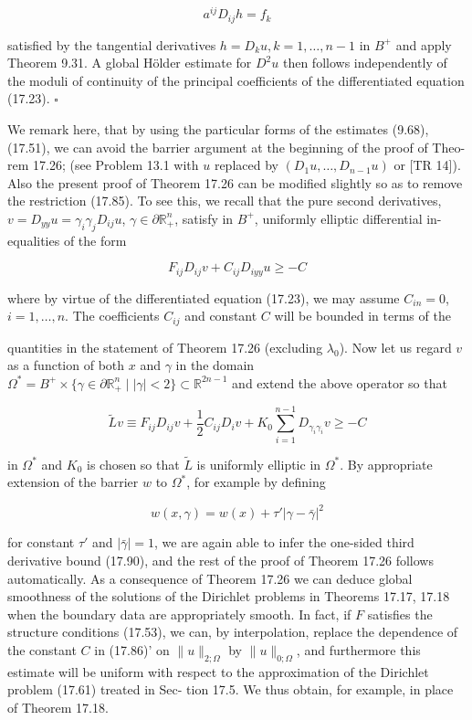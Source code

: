 \[
a^{ij} D_{ij} h = f_k
\]

satisfied by the tangential derivatives \(h = D_k u, k = 1,\ldots,n-1\) in \(B^+\) and apply
Theorem 9.31. A global Hölder estimate for \(D^2 u\) then follows independently of the
moduli of continuity of the principal coefficients of the differentiated equation
(17.23). \(\square\)

We remark here, that by using the particular forms of the estimates (9.68),
(17.51), we can avoid the barrier argument at the beginning of the proof of Theo-
rem 17.26; (see Problem 13.1 with \(u\) replaced by \((D_1 u, \ldots, D_{n-1} u)\) or [TR 14]).
Also the present proof of Theorem 17.26 can be modified slightly so as to remove
the restriction (17.85). To see this, we recall that the pure second derivatives,
\(v = D_{yy} u = \gamma_i \gamma_j D_{ij} u\), \(\gamma \in \partial \mathbb{R}_+^n\), satisfy in \(B^+\), uniformly elliptic differential in-
equalities of the form

\[
F_{ij} D_{ij} v + C_{ij} D_{iyy} u \ge -C
\]

where by virtue of the differentiated equation (17.23), we may assume \(C_{in} = 0\),
\(i = 1,\ldots,n\). The coefficients \(C_{ij}\) and constant \(C\) will be bounded in terms of the


quantities in the statement of Theorem 17.26 (excluding $\lambda_0$). Now let us regard $v$ as
a function of both $x$ and $\gamma$ in the domain $\Omega^* = B^+ \times \{ \gamma \in \partial \mathbb{R}_+^n \mid |\gamma| < 2\} \subset \mathbb{R}^{2n-1}$
and extend the above operator so that

\[
\tilde{L}v \equiv F_{ij} D_{ij} v + \frac{1}{2} C_{ij} D_i v + K_0 \sum_{i=1}^{n-1} D_{\gamma_i \gamma_i} v \geq -C
\]

in $\Omega^*$ and $K_0$ is chosen so that $\tilde{L}$ is uniformly elliptic in $\Omega^*$. By appropriate
extension of the barrier $w$ to $\Omega^*$, for example by defining

\[
w(x,\gamma) = w(x) + \tau' |\gamma - \bar{\gamma}|^2
\]

for constant $\tau'$ and $|\bar{\gamma}| = 1$, we are again able to infer the one-sided third derivative
bound (17.90), and the rest of the proof of Theorem 17.26 follows automatically.
    As a consequence of Theorem 17.26 we can deduce global smoothness of the
solutions of the Dirichlet problems in Theorems 17.17, 17.18 when the boundary
data are appropriately smooth. In fact, if $F$ satisfies the structure conditions
(17.53), we can, by interpolation, replace the dependence of the constant $C$ in
(17.86)' on $\|u\|_{2;\Omega}$ by $\|u\|_{0;\Omega}$, and furthermore this estimate will be uniform with
respect to the approximation of the Dirichlet problem (17.61) treated in Sec-
tion 17.5. We thus obtain, for example, in place of Theorem 17.18.

